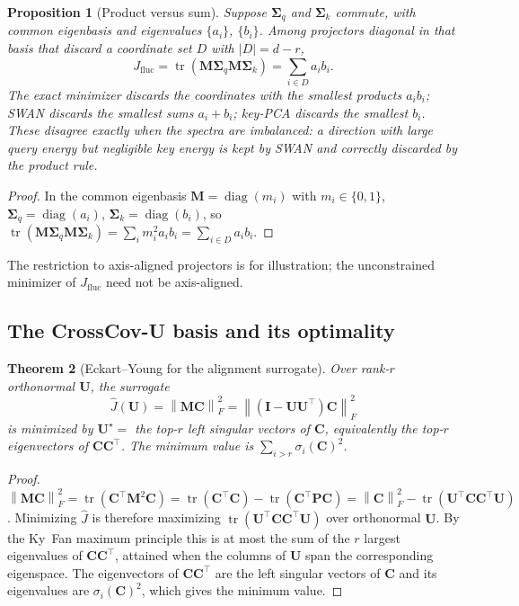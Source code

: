 \documentclass[10pt]{article}
\newcommand{\tr}{\operatorname{tr}}
\newcommand{\diag}{\operatorname{diag}}
\newcommand{\norm}[1]{\left\lVert #1 \right\rVert}
\newcommand{\fro}[1]{\norm{#1}_F}
\newcommand{\bU}{\mathbf{U}}
\newcommand{\bC}{\mathbf{C}}
\newcommand{\bM}{\mathbf{M}}
\newcommand{\bP}{\mathbf{P}}
\newcommand{\bI}{\mathbf{I}}
\newcommand{\Sq}{\bm{\Sigma}_q}
\newcommand{\Sk}{\bm{\Sigma}_k}
\newcommand{\Jfl}{J_{\mathrm{fluc}}}
\newcommand{\method}{CrossCov-U}
\theoremstyle{plain}
\newtheorem{theorem}{Theorem}[section]
\newtheorem{proposition}[theorem]{Proposition}
\theoremstyle{definition}
\theoremstyle{remark}
\begin{document}
\begin{proposition}[Product versus sum]
\label{prop:prodsum}
Suppose $\Sq$ and $\Sk$ commute, with common eigenbasis and eigenvalues
$\{a_i\}$, $\{b_i\}$. Among projectors diagonal in that basis that discard a
coordinate set $D$ with $|D|=d-r$,
\begin{equation}
  \Jfl=\tr(\bM\Sq\bM\Sk)=\sum_{i\in D}a_ib_i .
\end{equation}
The exact minimizer discards the coordinates with the smallest
\emph{products} $a_ib_i$; SWAN discards the smallest \emph{sums} $a_i+b_i$;
key-PCA discards the smallest $b_i$. These disagree exactly when the spectra
are imbalanced: a direction with large query energy but negligible key energy
is kept by SWAN and correctly discarded by the product rule.
\end{proposition}
\begin{proof}
In the common eigenbasis $\bM=\diag(m_i)$ with $m_i\in\{0,1\}$,
$\Sq=\diag(a_i)$, $\Sk=\diag(b_i)$, so
$\tr(\bM\Sq\bM\Sk)=\sum_i m_i^2a_ib_i=\sum_{i\in D}a_ib_i$.
\end{proof}
The restriction to axis-aligned projectors is for illustration; the
unconstrained minimizer of $\Jfl$ need not be axis-aligned.

\subsection{The \method{} basis and its optimality}
\label{sec:surrogate}

\begin{theorem}[Eckart--Young for the alignment surrogate]
\label{thm:ey}
Over rank-$r$ orthonormal $\bU$, the surrogate
\begin{equation}
  \label{eq:surrogate}
  \hat J(\bU)=\fro{\bM\bC}^2=\fro{(\bI-\bU\bU^\top)\bC}^2
\end{equation}
is minimized by $\bU^\star=$ the top-$r$ left singular vectors of $\bC$,
equivalently the top-$r$ eigenvectors of $\bC\bC^\top$. The minimum value is
$\sum_{i>r}\sigma_i(\bC)^2$.
\end{theorem}
\begin{proof}
$\fro{\bM\bC}^2=\tr(\bC^\top\bM^2\bC)=\tr(\bC^\top\bC)-\tr(\bC^\top\bP\bC)
=\fro{\bC}^2-\tr(\bU^\top\bC\bC^\top\bU)$.
Minimizing $\hat J$ is therefore maximizing $\tr(\bU^\top\bC\bC^\top\bU)$
over orthonormal $\bU$. By the Ky~Fan maximum principle this is at most the
sum of the $r$ largest eigenvalues of $\bC\bC^\top$, attained when the
columns of $\bU$ span the corresponding eigenspace. The eigenvectors of
$\bC\bC^\top$ are the left singular vectors of $\bC$ and its eigenvalues are
$\sigma_i(\bC)^2$, which gives the minimum value.
\end{proof}
\end{document}
